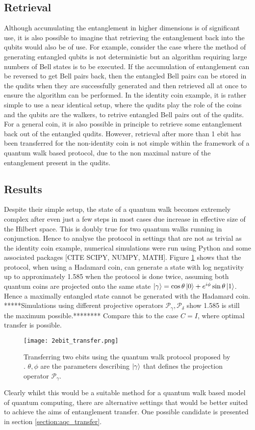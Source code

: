\subsection{Retrieval}
\label{subsection:qw_retrieval}
Although accumulating the entanglement in higher dimensions is of significant use, it is also possible to imagine that retrieving the entanglement back into the qubits would also be of use.
For example, consider the case where the method of generating entangled qubits is not deterministic but an algorithm requiring large numbers of Bell states is to be executed.
If the accumulation of entanglement can be reversed to get Bell pairs back, then the entangled Bell pairs can be stored in the qudits when they are successfully generated and then retrieved all at once to ensure the algorithm can be performed.
In the identity coin example, it is rather simple to use a near identical setup, where the qudits play the role of the coins and the qubits are the walkers, to retrive entangled Bell pairs out of the qudits.
For a general coin, it is also possible in principle to retrieve some entanglement back out of the entangled qudits.
However, retrieval after more than 1 ebit has been transferred for the non-identity coin is not simple within the framework of a quantum walk based protocol, due to the non maximal nature of the entanglement present in the qudits.

\subsection{Results}
\label{subsection:results}
Despite their simple setup, the state of a quantum walk becomes extremely complex after even just a few steps in most cases due increase in effective size of the Hilbert space.
This is doubly true for two quantum walks running in conjunction.
Hence to analyse the protocol in settings that are not as trivial as the identity coin example, numerical simulations were run using Python and some associated packages [CITE SCIPY, NUMPY, MATH].
Figure \ref{fig:2ebittransfer} shows that the protocol, when using a Hadamard coin, can generate a state with log negativity up to approximately 1.585 when the protocol is done twice, assuming both quantum coins are projected onto the same state $\ket{\gamma} = \cos{\theta}\ket{0} + e^{i\phi}\sin{\theta}\ket{1}$.
Hence a maximally entangled state cannot be generated with the Hadamard coin.
*****Simulations using different projective operators $\mathcal{P}_\gamma, \mathcal{P}_\delta$ show 1.585 is still the maximum possible.********
Compare this to the case $C = I$, where optimal transfer is possible.
\begin{figure}
    \centering
    \texttt{[image: 2ebit\_transfer.png]}
    \caption{Transferring two ebits using the quantum walk protocol proposed by \cite{giordani2020}. $\theta, \phi$ are the parameters describing $\ket{\gamma}$ that defines the projection operator $\mathcal{P}_\gamma$.}
    \label{fig:2ebittransfer}
\end{figure}

Clearly whilst this would be a suitable method for a quantum walk based model of quantum computing, there are alternative settings that would be better suited to achieve the aims of entanglement transfer. One possible candidate is presented in section \ref{section:aqc_transfer}.